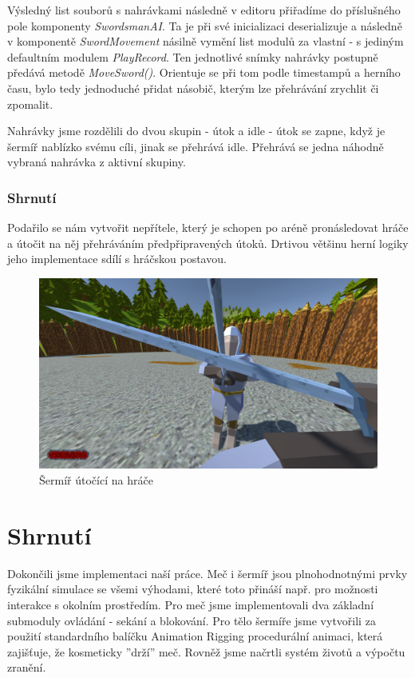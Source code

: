 \bigbreak

Výsledný list souborů s nahrávkami následně v editoru přiřadíme do příslušného pole komponenty \textit{SwordsmanAI}. Ta je při své inicializaci deserializuje a následně v komponentě \textit{SwordMovement} násilně vymění list modulů za vlastní - s jediným defaultním modulem \textit{PlayRecord}. Ten jednotlivé snímky nahrávky postupně předává metodě \textit{MoveSword()}. Orientuje se při tom podle timestampů a herního času, bylo tedy jednoduché přidat násobič, kterým lze přehrávání zrychlit či zpomalit.

Nahrávky jsme rozdělili do dvou skupin - útok a idle - útok se zapne, když je šermíř nablízko svému cíli, jinak se přehrává idle. Přehrává se jedna náhodně vybraná nahrávka z aktivní skupiny.

\subsubsection*{Shrnutí}

Podařilo se nám vytvořit nepřítele, který je schopen po aréně pronásledovat hráče a útočit na něj přehráváním předpřipravených útoků. Drtivou většinu herní logiky jeho implementace sdílí s hráčskou postavou.

\begin{figure}[h!]\centering
  \center
  \includegraphics[width=140mm]{../img/demogameFight.png}
  \caption{Šermíř útočící na hráče}
  \label{obr05:demogameFight}
\end{figure} 

\section{Shrnutí}

Dokončili jsme implementaci naší práce. Meč i šermíř jsou plnohodnotnými prvky fyzikální simulace se všemi výhodami, které toto přináší např. pro možnosti interakce s okolním prostředím. Pro meč jsme implementovali dva základní submoduly ovládání - sekání a blokování. Pro tělo šermíře jsme vytvořili za použití standardního balíčku Animation Rigging \cite{AnimationRigging} procedurální animaci, která zajišťuje, že kosmeticky ''drží'' meč. Rovněž jsme načrtli systém životů a výpočtu zranění.

